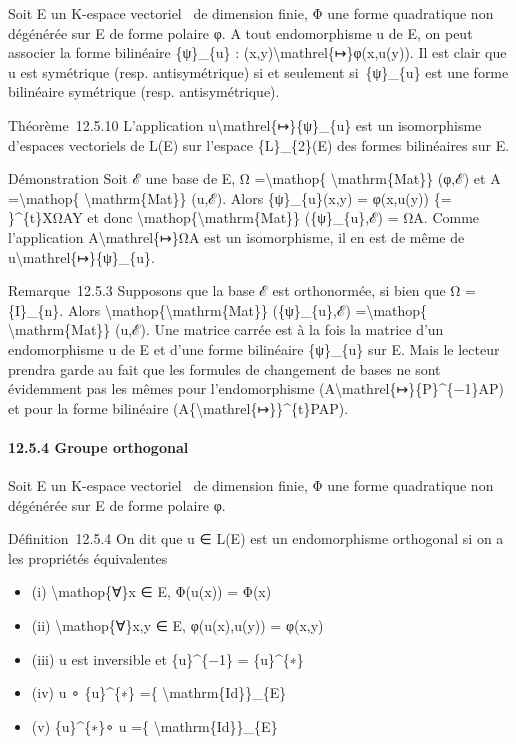 \documentclass[]{article}
\begin{document}
Soit E un K-espace vectoriel ~de dimension finie, Φ une forme
quadratique non dégénérée sur E de forme polaire φ. A tout endomorphisme
u de E, on peut associer la forme bilinéaire \{ψ\}\_\{u\} :
(x,y)\textbackslash{}mathrel\{↦\}φ(x,u(y)). Il est clair que u est
symétrique (resp. antisymétrique) si et seulement si~\{ψ\}\_\{u\} est
une forme bilinéaire symétrique (resp. antisymétrique).

Théorème~12.5.10 L'application u\textbackslash{}mathrel\{↦\}\{ψ\}\_\{u\}
est un isomorphisme d'espaces vectoriels de L(E) sur l'espace
\{L\}\_\{2\}(E) des formes bilinéaires sur E.

Démonstration Soit ℰ une base de E, Ω =\textbackslash{}mathop\{
\textbackslash{}mathrm\{Mat\}\} (φ,ℰ) et A =\textbackslash{}mathop\{
\textbackslash{}mathrm\{Mat\}\} (u,ℰ). Alors \{ψ\}\_\{u\}(x,y) =
φ(x,u(y)) \{= \}\^{}\{t\}XΩAY et donc
\textbackslash{}mathop\{\textbackslash{}mathrm\{Mat\}\} (\{ψ\}\_\{u\},ℰ)
= ΩA. Comme l'application A\textbackslash{}mathrel\{↦\}ΩA est un
isomorphisme, il en est de même de
u\textbackslash{}mathrel\{↦\}\{ψ\}\_\{u\}.

Remarque~12.5.3 Supposons que la base ℰ est orthonormée, si bien que Ω =
\{I\}\_\{n\}. Alors
\textbackslash{}mathop\{\textbackslash{}mathrm\{Mat\}\} (\{ψ\}\_\{u\},ℰ)
=\textbackslash{}mathop\{ \textbackslash{}mathrm\{Mat\}\} (u,ℰ). Une
matrice carrée est à la fois la matrice d'un endomorphisme u de E et
d'une forme bilinéaire \{ψ\}\_\{u\} sur E. Mais le lecteur prendra garde
au fait que les formules de changement de bases ne sont évidemment pas
les mêmes pour l'endomorphisme
(A\textbackslash{}mathrel\{↦\}\{P\}\^{}\{−1\}AP) et pour la forme
bilinéaire (A\{\textbackslash{}mathrel\{↦\}\}\^{}\{t\}PAP).

\paragraph{12.5.4 Groupe orthogonal}

Soit E un K-espace vectoriel ~de dimension finie, Φ une forme
quadratique non dégénérée sur E de forme polaire φ.

Définition~12.5.4 On dit que u ∈ L(E) est un endomorphisme orthogonal si
on a les propriétés équivalentes

\begin{itemize}
\itemsep1pt\parskip0pt
\item
  (i) \textbackslash{}mathop\{∀\}x ∈ E, Φ(u(x)) = Φ(x)
\item
  (ii) \textbackslash{}mathop\{∀\}x,y ∈ E, φ(u(x),u(y)) = φ(x,y)
\item
  (iii) u est inversible et \{u\}\^{}\{−1\} = \{u\}\^{}\{∗\}
\item
  (iv) u ∘ \{u\}\^{}\{∗\} =\{ \textbackslash{}mathrm\{Id\}\}\_\{E\}
\item
  (v) \{u\}\^{}\{∗\}∘ u =\{ \textbackslash{}mathrm\{Id\}\}\_\{E\}
\end{itemize}
\end{document}
